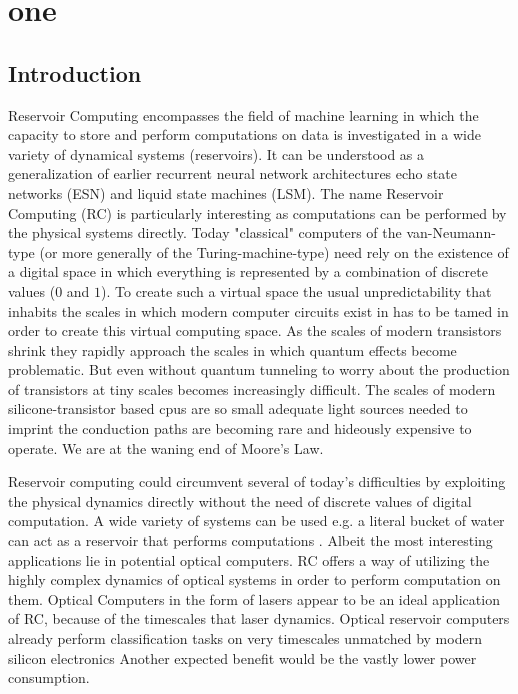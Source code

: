 \chapter{one}

\section{Introduction}

	Reservoir Computing encompasses the field of machine learning in which the capacity to store and perform computations on data is investigated in a wide variety of dynamical systems (reservoirs). It can be understood as a generalization of earlier recurrent neural network architectures echo state networks (ESN) and liquid state machines (LSM). The name Reservoir Computing (RC) is particularly interesting as computations can be performed by the physical systems directly. Today "classical" computers of the van-Neumann-type (or more generally of the Turing-machine-type) need rely on the existence of a digital space in which everything is represented by a combination of discrete values ($0$ and $1$). To create such a virtual space the usual unpredictability that inhabits the scales in which modern computer circuits exist in has to be tamed in order to create this virtual computing space. As the scales of modern transistors shrink they rapidly approach the scales in which quantum effects become problematic. But even without quantum tunneling to worry about the production of transistors at tiny scales becomes increasingly difficult. The scales of modern silicone-transistor based cpus are so small adequate light sources needed to imprint the conduction paths are becoming rare and hideously expensive to operate. We are at the waning end of Moore's Law.
	
	Reservoir computing could circumvent several of today's difficulties by exploiting the physical dynamics directly without the need of discrete values of digital computation. 
	A wide variety of systems can be used e.g. a literal bucket of water can act as a reservoir that performs computations \cite{FER03}. Albeit the most interesting applications lie in potential optical computers. RC offers a way of utilizing the highly complex dynamics of optical systems in order to perform computation on them. Optical Computers in the form of lasers appear to be an ideal application of RC, because of the timescales that laser dynamics.  Optical reservoir computers already perform classification tasks on very timescales unmatched by modern silicon electronics \cite{BRU13a}
	Another expected benefit would be the vastly lower power consumption.  
	

